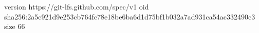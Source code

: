 version https://git-lfs.github.com/spec/v1
oid sha256:2a5c921d9e253cb764fc78e18be6ba6d1d75bf1b032a7ad931ca54ac332490c3
size 66
